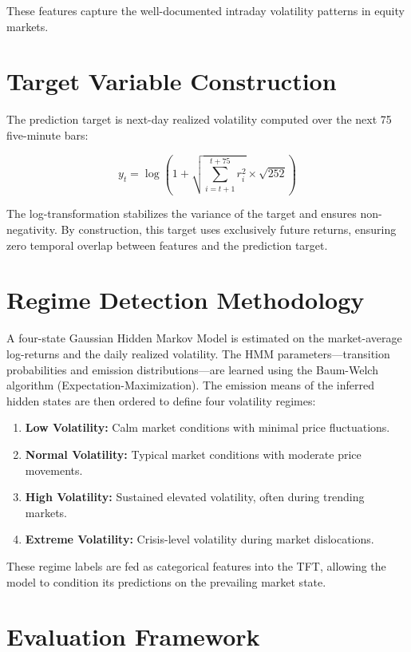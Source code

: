 These features capture the well-documented intraday volatility patterns in equity markets.

\section{Target Variable Construction}

The prediction target is next-day realized volatility computed over the next 75 five-minute bars:

\begin{equation}
y_t = \log\!\left(1 + \sqrt{\sum_{i=t+1}^{t+75} r_i^2} \times \sqrt{252}\right)
\end{equation}

The log-transformation stabilizes the variance of the target and ensures non-negativity. By construction, this target uses exclusively future returns, ensuring zero temporal overlap between features and the prediction target.

\section{Regime Detection Methodology}

A four-state Gaussian Hidden Markov Model is estimated on the market-average log-returns and the daily realized volatility. The HMM parameters---transition probabilities and emission distributions---are learned using the Baum-Welch algorithm (Expectation-Maximization). The emission means of the inferred hidden states are then ordered to define four volatility regimes:

\begin{enumerate}
    \item \textbf{Low Volatility:} Calm market conditions with minimal price fluctuations.
    \item \textbf{Normal Volatility:} Typical market conditions with moderate price movements.
    \item \textbf{High Volatility:} Sustained elevated volatility, often during trending markets.
    \item \textbf{Extreme Volatility:} Crisis-level volatility during market dislocations.
\end{enumerate}

These regime labels are fed as categorical features into the TFT, allowing the model to condition its predictions on the prevailing market state.

\section{Evaluation Framework}

